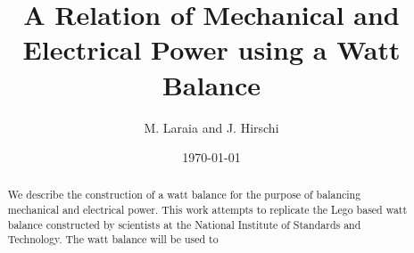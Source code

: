 \documentclass[aps,prstab,reprint,12pt]{revtex4-1}
\begin{document}
\title{A Relation of Mechanical and Electrical Power using a Watt Balance}

\author{M. Laraia and J. Hirschi}


\date{\today}

\begin{abstract}
    
    We describe the construction of a watt balance for the purpose of balancing mechanical and electrical power. This work attempts to replicate the Lego based watt balance constructed by scientists at the National Institute of Standards and Technology. The watt balance will be used to 


\end{abstract}

\maketitle
\end{document}
